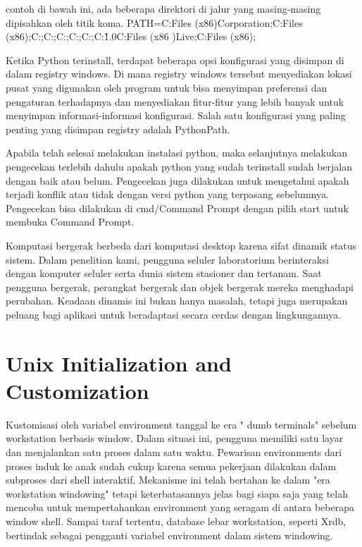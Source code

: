 contoh di bawah ini, ada beberapa direktori di jalur yang masing-masing dipisahkan oleh titik koma.
PATH=C:\Program Files (x86)\NVIDIA Corporation\PhysX\Common;C:\Program Files (x86)\WinSCP;C:\Perl\site\bin;C:\Perl\bin;C:\WINDOWS{};C:\WINDOWS;C:\WINDOWS {}\Wbem;C:\WINDOWS{}\WindowsPowerShell\v1.0\;C:\Program Files (x86 )\Windows Live\Shared;C:\Program Files (x86)\FAHClient;

Ketika Python terinstall, terdapat beberapa opsi konfigurasi yang disimpan di dalam registry windows. Di mana registry windows tersebut menyediakan lokasi pusat yang digunakan oleh program untuk bisa menyimpan preferensi dan pengaturan terhadapnya dan menyediakan fitur-fitur yang lebih banyak untuk menyimpan informasi-informasi konfigurasi. Salah satu konfigurasi yang paling penting yang disimpan registry adalah PythonPath.\cite{hammond2000python}

Apabila telah selesai melakukan instalasi python, maka selanjutnya melakukan pengecekan terlebih dahulu apakah python yang sudah terinstall sudah berjalan dengan baik atau belum. Pengecekan juga dilakukan untuk mengetahui apakah terjadi konflik atau tidak dengan versi python yang terpasang sebelumnya. Pengecekan bisa dilakukan di cmd/Command Prompt dengan pilih start untuk membuka Command Prompt. \cite{mckinney2012python}

Komputasi bergerak berbeda dari komputasi desktop karena sifat dinamik status sistem. Dalam penelitian kami, pengguna seluler laboratorium berinteraksi dengan komputer seluler serta dunia sistem stasioner dan tertanam. Saat pengguna bergerak, perangkat bergerak dan objek bergerak mereka menghadapi perubahan. Keadaan dinamis ini bukan hanya masalah, tetapi juga merupakan peluang bagi aplikasi untuk beradaptasi secara cerdas dengan lingkungannya.

\section {Unix Initialization and Customization}

Kustomisasi oleh variabel environment tanggal ke era " dumb terminals" sebelum workstation berbasis window. Dalam situasi ini, pengguna memiliki satu layar dan menjalankan satu proses dalam satu waktu. Pewarisan environments dari proses induk ke anak sudah cukup karena semua pekerjaan dilakukan dalam subproses dari shell interaktif. Mekanisme ini telah bertahan ke dalam "era workstation windowing" tetapi keterbatasannya jelas bagi siapa saja yang telah mencoba untuk mempertahankan environment yang seragam di antara beberapa window shell. Sampai taraf tertentu, database lebar workstation, seperti Xrdb, bertindak sebagai pengganti variabel environment dalam sistem windowing. \cite{schilit1993customizing}







